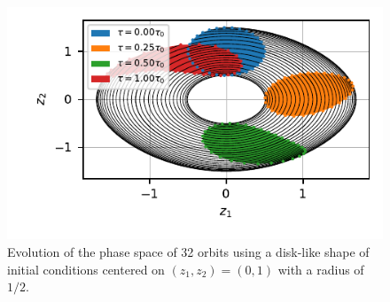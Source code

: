 
\begin{figure}
    \centering
    \includegraphics{CodeAndFigures/PendulumPhaseSpaceUs2d.pdf}
    \caption{Evolution of the phase space of 32 orbits using a disk-like shape of initial conditions centered on $(z_1,z_2)=(0,1)$ with a radius of $1/2$.}
    \label{fig:pend2d}
\end{figure}

